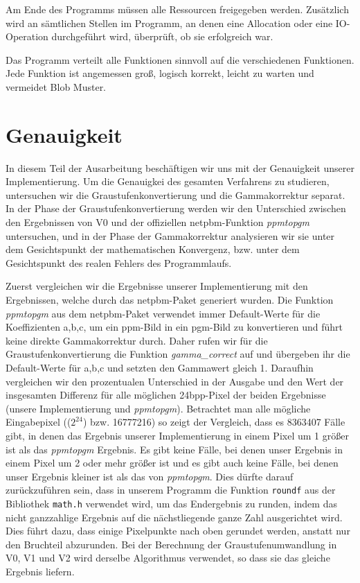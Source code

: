 \documentclass[course=erap]{aspdoc}
\begin{document}
\par
Am Ende des Programms müssen alle Ressourcen freigegeben werden. Zusätzlich wird an sämtlichen Stellen im Programm, an denen eine Allocation oder eine IO-Operation durchgeführt wird, überprüft, ob sie erfolgreich war.

\par
Das Programm verteilt alle Funktionen sinnvoll auf die verschiedenen Funktionen. Jede Funktion ist angemessen groß, logisch korrekt, leicht zu warten und vermeidet Blob Muster.

\section{Genauigkeit}

\par
In diesem Teil der Ausarbeitung beschäftigen wir uns mit der Genauigkeit unserer Implementierung. Um die Genauigkei des gesamten Verfahrens zu studieren, untersuchen wir die Graustufenkonvertierung und die Gammakorrektur separat. In der Phase der Graustufenkonvertierung werden wir den Unterschied zwischen den Ergebnissen von V0 und der offiziellen netpbm-Funktion \textit{ppmtopgm} untersuchen, und in der Phase der Gammakorrektur analysieren wir sie unter dem Gesichtspunkt der mathematischen Konvergenz, bzw. unter dem Gesichtspunkt des realen Fehlers des Programmlaufs.

\par
Zuerst vergleichen wir die Ergebnisse unserer Implementierung mit den Ergebnissen, welche durch das netpbm-Paket generiert wurden. Die Funktion \textit{ppmtopgm} aus dem netpbm-Paket verwendet immer Default-Werte für die Koeffizienten a,b,c, um ein ppm-Bild in ein pgm-Bild zu konvertieren und führt keine direkte Gammakorrektur durch. Daher rufen wir für die Graustufenkonvertierung die Funktion \textit{gamma\_correct} auf und übergeben ihr die Default-Werte für a,b,c und setzten den Gammawert gleich 1. Daraufhin vergleichen wir den prozentualen Unterschied in der Ausgabe und den Wert der insgesamten Differenz für alle möglichen 24bpp-Pixel der beiden Ergebnisse (unsere Implementierung und \textit{ppmtopgm}). Betrachtet man alle mögliche Eingabepixel (($2^{24}$) bzw. 16777216) so zeigt der Vergleich, dass es 8363407 Fälle gibt, in denen das Ergebnis unserer Implementierung in einem Pixel um 1 größer ist als das \textit{ppmtopgm} Ergebnis. Es gibt keine Fälle, bei denen unser Ergebnis in einem Pixel um 2 oder mehr größer ist und es gibt auch keine Fälle, bei denen unser Ergebnis kleiner ist als das von \textit{ppmtopgm}. Dies dürfte darauf zurückzuführen sein, dass in unserem Programm die Funktion \texttt{roundf} aus der Bibliothek \texttt{math.h} verwendet wird, um das Endergebnis zu runden, indem das nicht ganzzahlige Ergebnis auf die nächstliegende ganze Zahl ausgerichtet wird. Dies führt dazu, dass einige Pixelpunkte nach oben gerundet werden, anstatt nur den Bruchteil abzurunden. Bei der Berechnung der Graustufenumwandlung in V0, V1 und V2 wird derselbe Algorithmus verwendet, so dass sie das gleiche Ergebnis liefern.
\end{document}

